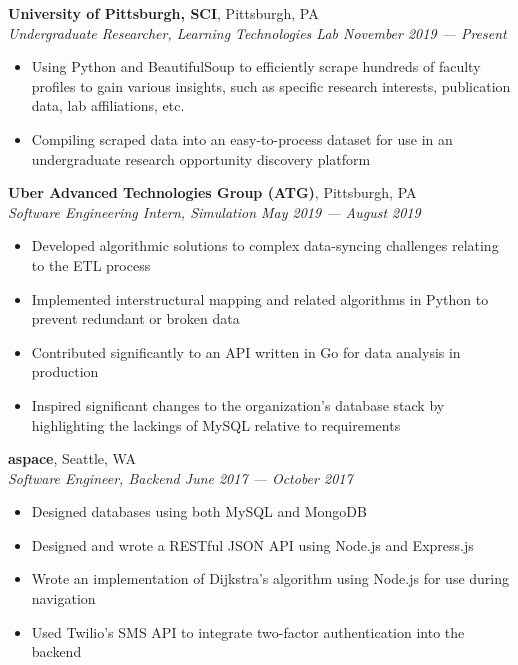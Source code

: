 \documentclass[11pt]{article}
\begin{document}
\begin{flushleft}
		\vspace{2.25mm}
		\textbf{University of Pittsburgh, SCI}, Pittsburgh, PA\\
		\textit{\small Undergraduate Researcher, Learning Technologies Lab \hfill November 2019 --- Present}
		\vspace{-1.25mm}
		\begin{itemize}
			\item Using Python and BeautifulSoup to efficiently scrape hundreds of faculty profiles to gain various insights, such as specific research interests, publication data, lab affiliations, etc.
			\vspace{-2mm}
			\item Compiling scraped data into an easy-to-process dataset for use in an undergraduate research opportunity discovery platform
		\end{itemize}

		\vspace{-1.25mm}
		\textbf{Uber Advanced Technologies Group (ATG)}, Pittsburgh, PA\\
		\textit{\small Software Engineering Intern, Simulation \hfill May 2019 --- August 2019}
		\vspace{-1.25mm}
		\begin{itemize}
			\item Developed algorithmic solutions to complex data-syncing challenges relating to the ETL process
			\vspace{-2mm}
			\item Implemented interstructural mapping and related algorithms in Python to prevent redundant or broken data
			\vspace{-2mm}
			\item Contributed significantly to an API written in Go for data analysis in production
			\vspace{-2mm}
			\item Inspired significant changes to the organization's database stack by highlighting the lackings of MySQL relative to requirements
		\end{itemize}
	
		\vspace{-1.25mm}
		\textbf{aspace}, Seattle, WA\\
		\textit{\small Software Engineer, Backend \hfill June 2017 --- October 2017}
		\vspace{-1.25mm}
		\begin{itemize}
			\item Designed databases using both MySQL and MongoDB
			\vspace{-2mm}
			\item Designed and wrote a RESTful JSON API using Node.js and Express.js
			\vspace{-2mm}
			\item Wrote an implementation of Dijkstra's algorithm using Node.js for use during navigation
			\vspace{-2mm}
			\item Used Twilio's SMS API to integrate two-factor authentication into the backend
		\end{itemize}
		

\end{flushleft}
\end{document}
